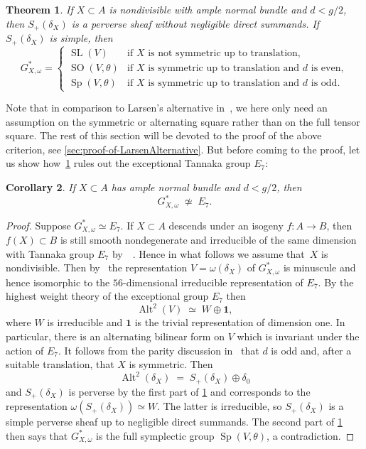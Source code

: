 \documentclass[a4paper]{amsart}
\DeclareMathOperator{\SL}{SL}
\DeclareMathOperator{\SO}{SO}
\DeclareMathOperator{\Sp}{Sp}
\DeclareMathOperator{\Alt}{Alt}
\theoremstyle{plain}
\newtheorem{theorem}{Theorem}[section]
\newtheorem{corollary}[theorem]{Corollary}
\theoremstyle{definition}
\numberwithin{equation}{section}
\begin{document}
\begin{theorem} \label{th:LarsenAlternative} If $X\subset A$ is nondivisible with ample normal bundle and $d < g / 2$, then 
$ S_+(\delta_X)$ is a perverse sheaf without negligible direct summands. If~$S_+(\delta_X)$ is simple, then
\[
G_{X, \omega}^\ast = 
\begin{cases}
\SL(V) & \text{if $X$ is not symmetric up to translation}, \\
\SO(V, \theta) & \text{if $X$ is symmetric up to translation and $d$ is even}, \\
\Sp(V, \theta) & \text{if $X$ is symmetric up to translation and  $d$ is odd}.
\end{cases}
\]
\end{theorem}

Note that in comparison to Larsen's alternative in~\cite[lemma 3.7]{JKLM}, we here only need an assumption on the symmetric or alternating square rather than on the full tensor square. The rest of this section will be devoted to the proof of the above criterion, see \cref{sec:proof-of-LarsenAlternative}. But before coming to the proof, let us show how~\cref{th:LarsenAlternative} rules out the exceptional Tannaka group $E_7$:


\begin{corollary} \label{Cor:NoE7}
If $X\subset A$ has ample normal bundle and $d < g / 2$, then
\[G_{X, \omega}^\ast \; \not \simeq \; E_7.\]
\end{corollary}

\begin{proof}
Suppose $G_{X, \omega}^\ast \simeq E_7$. 
If $X\subset A$ descends under an isogeny $f\colon A\to B$, then~$f(X)\subset B$ is still smooth nondegenerate and irreducible of the same dimension with Tannaka group $E_7$ by~\cite[rem.~2.6]{JKLM}~\cite[cor.~1.6(a)]{KraemerMicrolocalI}. Hence in what follows we assume that~$X$ is nondivisible. Then by~\cite[cor.~1.10]{KraemerMicrolocalI} the representation $V= \omega(\delta_X)$ of $G_{X,\omega}^\ast$ is minuscule and hence isomorphic to the $56$-dimensional irreducible representation of $E_7$. By the highest weight theory of the exceptional group $E_7$ then
%
\[
\Alt^2(V) \;\simeq\; W \oplus \mathbf{1},\]
%
where $W$ is irreducible and $\mathbf{1}$ is the trivial representation of dimension one. In particular, there is an alternating bilinear form on $V$ which is invariant under the action of $E_7$. It follows from the parity discussion in~\cite[sect.~1.2]{JKLM} that $d$ is odd and, after a suitable translation, that $X$ is symmetric. Then
%
\[
 \Alt^2(\delta_X) \;=\; S_+(\delta_X) \oplus \delta_0 
\]
%
and $S_+(\delta_X)$ is perverse by the first part of \cref{th:LarsenAlternative} and corresponds to the representation $\omega(S_+(\delta_X))\simeq W$. The latter is irreducible, so $S_+(\delta_X)$ is a simple perverse sheaf up to negligible direct summands. The second part of \cref{th:LarsenAlternative} then says that $G_{X, \omega}^\ast$ is the full symplectic group $\Sp(V, \theta)$, a contradiction.
\end{proof} 
\end{document}
